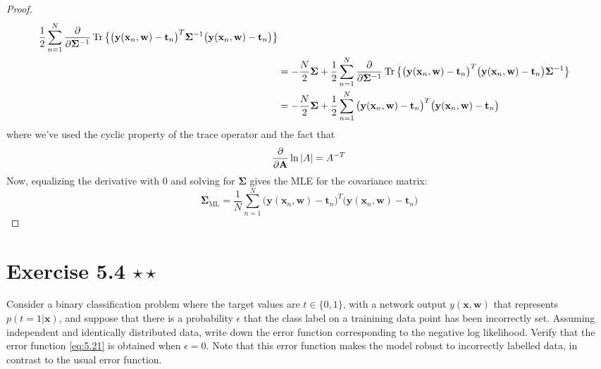 \begin{proof}
\begin{align*}
        \frac{1}{2}  \sum_{n=1}^{N} \pdv{\mathbf{\Sigma}^{-1}} 
        \Trace\big\{\big(\mathbf{y}(\mathbf{x}_n, \mathbf{w}) - \mathbf{t}_n\big)^T
        \mathbf{\Sigma}^{-1}\big(\mathbf{y}(\mathbf{x}_n, \mathbf{w}) - \mathbf{t}_n\big)\big\} \\
        &= -\frac{N}{2} \mathbf{\Sigma} 
        + \frac{1}{2}  \sum_{n=1}^{N} \pdv{\mathbf{\Sigma}^{-1}} 
        \Trace\big\{\big(\mathbf{y}(\mathbf{x}_n, \mathbf{w}) - \mathbf{t}_n\big)^T
        \big(\mathbf{y}(\mathbf{x}_n, \mathbf{w}) - \mathbf{t}_n\big) \mathbf{\Sigma}^{-1}\big\}\\
        &= -\frac{N}{2} \mathbf{\Sigma} + \frac{1}{2} \sum_{n=1}^{N} 
        \big(\mathbf{y}(\mathbf{x}_n, \mathbf{w}) - \mathbf{t}_n\big)^T
        \big(\mathbf{y}(\mathbf{x}_n, \mathbf{w}) - \mathbf{t}_n\big)
    \end{align*}
    where we've used the cyclic property of the trace operator and the fact that
    \[
        \pdv{\mathbf{A}} \ln |A| = A^{-T}
    \]
    Now, equalizing
    the derivative with 0 and solving for $\mathbf{\Sigma}$ gives
    the MLE for the covariance matrix:
    \[
        \mathbf{\Sigma}_\text{ML}
        = \frac{1}{N} \sum_{n=1}^{N} 
        \big(\mathbf{y}(\mathbf{x}_n, \mathbf{w}) - \mathbf{t}_n\big)^T
        \big(\mathbf{y}(\mathbf{x}_n, \mathbf{w}) - \mathbf{t}_n\big)
    \] 
\end{proof}

\section*{Exercise 5.4 $\star \star$}
Consider a binary classification problem where the target values
are $t \in \{0, 1\}$, with a network output $y(\mathbf{x}, \mathbf{w})$
that represents $p(t = 1 | \mathbf{x})$, and suppose that
there is a probability $\epsilon$ that the class label
on a trainining data point has been incorrectly set.
Assuming independent and identically distributed data,
write down the error function corresponding to the negative
log likelihood. Verify that the error function \eqref{eq:5.21}
is obtained when $\epsilon = 0$. Note that this error function
makes the model robust to incorrectly labelled data, in contrast
to the usual error function.

\vspace{1em}

